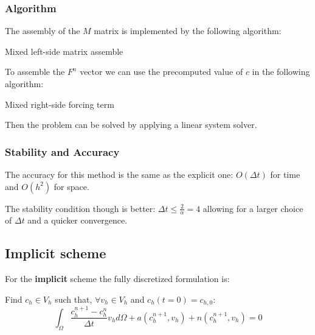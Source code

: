 \documentclass[12pt, letterpaper]{article}
\begin{document}
\subsubsection{Algorithm}
The assembly of the $M$ matrix is implemented by the following algorithm:

\begin{algorithm}
    \caption{Mixed left-side matrix assemble}

\end{algorithm}

To assemble the $F^n$ vector we can use the precomputed value of $c$ in the following algorithm:

\pagebreak

\begin{algorithm}
    \caption{Mixed right-side forcing term}

\end{algorithm}

\noindent Then the problem can be solved by applying a linear system solver.

\subsubsection{Stability and Accuracy}
The accuracy for this method is the same as the explicit one: $O(\Delta t)$ for time and $O(h^2)$ for space.

\noindent The stability condition though is better: $\Delta t\leq\frac2\alpha=4$ allowing for a larger choice of $\Delta t$ and a quicker convergence.

\subsection{Implicit scheme}
For the \textbf{implicit} scheme the fully discretized formulation is:

\vspace{1em}
\noindent
Find $c_h\in V_h$ such that, $\forall v_h\in V_h$ and $c_h(t=0)=c_{h,0}$:
$$\int_\Omega\frac{c_h^{n+1}-c_h^n}{\Delta t}v_hd\Omega+a(c_h^{n+1},v_h)+n(c_h^{n+1},v_h)=0$$
\end{document}
